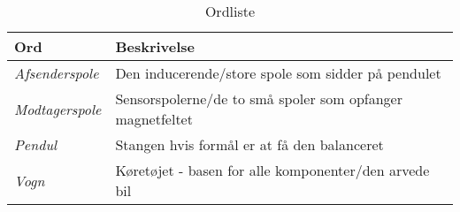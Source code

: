 \begin{table}[h!]
	\centering
	\caption{Ordliste}
	\label{tab:ordliste}
	\begin{threeparttable}
		\begin{tabular}{l l}
			\toprule
			\multicolumn{1}{l}{Ord}       &
			\multicolumn{1}{l}{Beskrivelse}  \\ 
			\midrule
			\textit{Afsenderspole}	& Den inducerende/store spole som sidder på pendulet\\
			\textit{Modtagerspole}	& Sensorspolerne/de to små spoler som opfanger magnetfeltet\\
			\textit{Pendul}			& Stangen hvis formål er at få den balanceret\\
			\textit{Vogn}			& Køretøjet - basen for alle komponenter/den arvede bil\\
			
			\bottomrule
		\end{tabular}
	\end{threeparttable}
\end{table}

